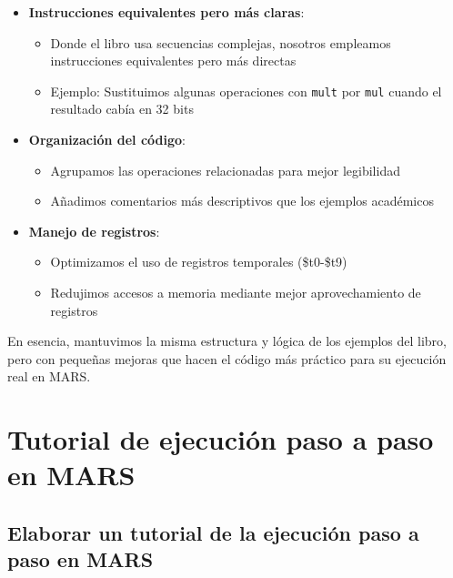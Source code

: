 \documentclass{article}
\begin{document}
\begin{itemize}[leftmargin=*]
    \item \textbf{Instrucciones equivalentes pero más claras}:
    \begin{itemize}
        \item Donde el libro usa secuencias complejas, nosotros empleamos instrucciones equivalentes pero más directas
        \item Ejemplo: Sustituimos algunas operaciones con \texttt{mult} por \texttt{mul} cuando el resultado cabía en 32 bits
    \end{itemize}
    
    \item \textbf{Organización del código}:
    \begin{itemize}
        \item Agrupamos las operaciones relacionadas para mejor legibilidad
        \item Añadimos comentarios más descriptivos que los ejemplos académicos
    \end{itemize}
    
    \item \textbf{Manejo de registros}:
    \begin{itemize}
        \item Optimizamos el uso de registros temporales (\$t0-\$t9)
        \item Redujimos accesos a memoria mediante mejor aprovechamiento de registros
    \end{itemize}
\end{itemize}

En esencia, mantuvimos la misma estructura y lógica de los ejemplos del libro, pero con pequeñas mejoras que hacen el código más práctico para su ejecución real en MARS.

\section{Tutorial de ejecución paso a paso en MARS}

\subsection{Elaborar un tutorial de la ejecución paso a paso en MARS}
\end{document}
